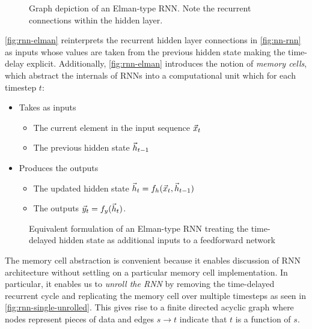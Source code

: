 
\begin{figure}[htpb]
    \centering
    
    \caption{Graph depiction of an Elman-type RNN. Note the recurrent connections
    within the hidden layer.}
    \label{fig:nn-rnn}
\end{figure}

\autoref{fig:rnn-elman} reinterprets the recurrent hidden layer connections in
\autoref{fig:nn-rnn} as inputs whose values are taken from the previous hidden
state making the time-delay explicit. Additionally, \autoref{fig:rnn-elman}
introduces the notion of \emph{memory cells}, which abstract the internals
of RNNs into a computational unit which for each timestep $t$:
\begin{itemize}
    \item Takes as inputs
        \begin{itemize}
            \item The current element in the input sequence $\vec{x}_t$
            \item The previous hidden state $\vec{h}_{t-1}$
        \end{itemize}
    \item Produces the outputs
        \begin{itemize}
            \item The updated hidden state $\vec{h}_t = f_h (\vec{x}_t, \vec{h}_{t-1})$
            \item The outputs $\vec{y}_t = f_y (\vec{h}_t)$.
        \end{itemize}
\end{itemize}

\begin{figure}[htpb]
    \centering
    
    \caption{Equivalent formulation of an Elman-type RNN treating the time-delayed hidden state
    as additional inputs to a feedforward network}
    \label{fig:rnn-elman}
\end{figure}

The memory cell abstraction is convenient because it enables discussion of RNN
architecture without settling on a particular memory cell implementation. In
particular, it enables us to \emph{unroll the RNN} by removing the time-delayed
recurrent cycle and replicating the memory cell over multiple timesteps as seen
in \autoref{fig:rnn-single-unrolled}. This gives rise to a finite directed
acyclic graph where nodes represent pieces of data and edges $s \to t$ indicate
that $t$ is a function of $s$.

